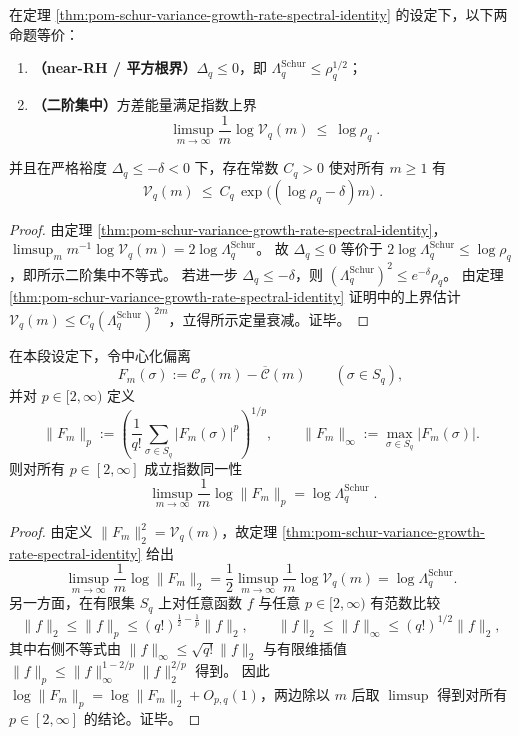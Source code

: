 \begin{corollary}[平方根门槛的纯方差判别]\label{cor:pom-schur-near-rh-variance-concentration}
在定理 \ref{thm:pom-schur-variance-growth-rate-spectral-identity} 的设定下，以下两命题等价：
\begin{enumerate}
  \item \textbf{（near-RH / 平方根界）}\(\Delta_q\le 0\)，即 \(\Lambda_q^{\mathrm{Schur}}\le \rho_q^{1/2}\)；
  \item \textbf{（二阶集中）}方差能量满足指数上界
  \[
  \boxed{\;
  \limsup_{m\to\infty}\frac{1}{m}\log \mathcal V_q(m)\ \le\ \log\rho_q\; }.
  \]
\end{enumerate}
并且在严格裕度 \(\Delta_q\le-\delta<0\) 下，存在常数 \(C_q>0\) 使对所有 \(m\ge 1\) 有
\[
\boxed{\;
\mathcal V_q(m)\ \le\ C_q\,\exp\!\bigl((\log\rho_q-\delta)m\bigr)\; } .
\]
\end{corollary}
\begin{proof}
由定理 \ref{thm:pom-schur-variance-growth-rate-spectral-identity}，
\(
\limsup_m m^{-1}\log\mathcal V_q(m)=2\log\Lambda_q^{\mathrm{Schur}}
\)。
故 \(\Delta_q\le 0\) 等价于 \(2\log\Lambda_q^{\mathrm{Schur}}\le \log\rho_q\)，即所示二阶集中不等式。
若进一步 \(\Delta_q\le-\delta\)，则 \((\Lambda_q^{\mathrm{Schur}})^{2}\le e^{-\delta}\rho_q\)。
由定理 \ref{thm:pom-schur-variance-growth-rate-spectral-identity} 证明中的上界估计
\(\mathcal V_q(m)\le C_q(\Lambda_q^{\mathrm{Schur}})^{2m}\)，立得所示定量衰减。证毕。
\end{proof}


\begin{theorem}\label{thm:pom-schur-envelope-lp-exponent-identity}
在本段设定下，令中心化偏离
\[
F_m(\sigma):=\mathcal{C}_\sigma(m)-\overline{\mathcal C}(m)\qquad(\sigma\in S_q),
\]
并对 \(p\in[2,\infty)\) 定义
\[
\|F_m\|_p:=\left(\frac{1}{q!}\sum_{\sigma\in S_q}|F_m(\sigma)|^p\right)^{1/p},
\qquad
\|F_m\|_\infty:=\max_{\sigma\in S_q}|F_m(\sigma)|.
\]
则对所有 \(p\in[2,\infty]\) 成立指数同一性
\[
\boxed{\;
\limsup_{m\to\infty}\frac{1}{m}\log \|F_m\|_p
=\log \Lambda_q^{\mathrm{Schur}}\; } .
\]
\end{theorem}
\begin{proof}
由定义 \(\|F_m\|_2^2=\mathcal V_q(m)\)，故定理 \ref{thm:pom-schur-variance-growth-rate-spectral-identity} 给出
\[
\limsup_{m\to\infty}\frac{1}{m}\log\|F_m\|_2
=\frac12\limsup_{m\to\infty}\frac{1}{m}\log\mathcal V_q(m)
=\log\Lambda_q^{\mathrm{Schur}}.
\]
另一方面，在有限集 \(S_q\) 上对任意函数 \(f\) 与任意 \(p\in[2,\infty)\) 有范数比较
\[
\|f\|_2\le \|f\|_p\le (q!)^{\frac12-\frac1p}\|f\|_2,
\qquad
\|f\|_2\le \|f\|_\infty\le (q!)^{1/2}\|f\|_2,
\]
其中右侧不等式由 \(\|f\|_\infty\le \sqrt{q!}\|f\|_2\) 与有限维插值 \(\|f\|_p\le \|f\|_\infty^{1-2/p}\|f\|_2^{2/p}\) 得到。
因此 \(\log\|F_m\|_p=\log\|F_m\|_2+O_{p,q}(1)\)，两边除以 \(m\) 后取 \(\limsup\) 得到对所有 \(p\in[2,\infty]\) 的结论。证毕。
\end{proof}

